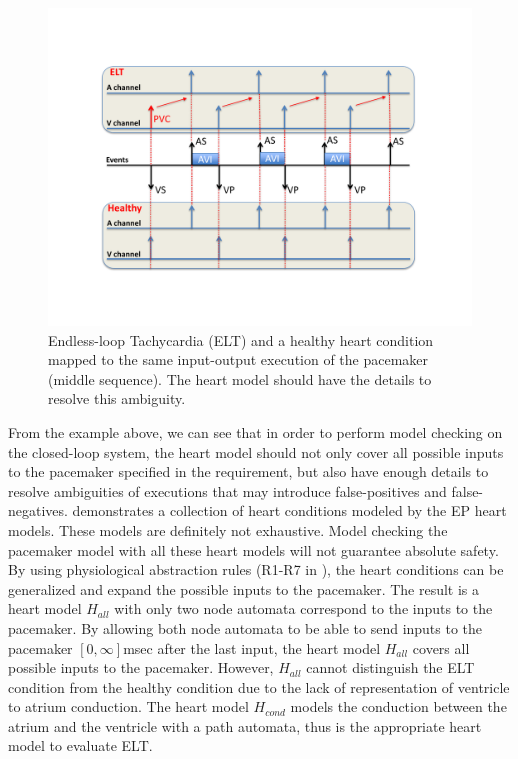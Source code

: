 \begin{figure}[t]
		\centering
		\includegraphics[width=\textwidth]{figs/ambiguity.pdf}
		\caption{\small Endless-loop Tachycardia (ELT) and a healthy heart condition mapped to the same input-output execution of the pacemaker (middle sequence). The heart model should have the details to resolve this ambiguity.}
		\label{fig:ambiguity}
\end{figure}
From the example above, we can see that in order to perform model checking on the closed-loop system, the heart model should not only cover all possible inputs to the pacemaker specified in the requirement, but also have enough details to resolve ambiguities of executions that may introduce false-positives and false-negatives. 
  demonstrates a collection of heart conditions modeled by the EP heart models. These models are definitely not exhaustive. Model checking the pacemaker model with all these heart models will not guarantee absolute safety. By using physiological abstraction rules (R1-R7 in ), the heart conditions can be generalized and expand the possible inputs to the pacemaker. The result is a heart model $H_{all}$ with only two node automata correspond to the inputs to the pacemaker. By allowing both node automata to be able to send inputs to the pacemaker $[0,\infty]$msec after the last input, the heart model $H_{all}$ covers all possible inputs to the pacemaker. However, $H_{all}$ cannot distinguish the ELT condition from the healthy condition due to the lack of representation of ventricle to atrium conduction. The heart model $H_{cond}$ models the conduction between the atrium and the ventricle with a path automata, thus is the appropriate heart model to evaluate ELT.
